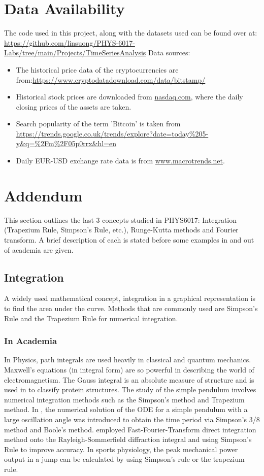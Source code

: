 \documentclass[a4paper, 10pt, conference]{ieeeconf}      %
\begin{document}
\section{Data Availability}{\label{data_aval}}
The code used in this project, along with the datasets used can be found over at: \url{https://github.com/linsuong/PHYS-6017-Labs/tree/main/Projects/TimeSeriesAnalysis}
\newline
Data sources:
\begin{itemize}
    \item The historical price data of the cryptocurrencies are from:\url{https://www.cryptodatadownload.com/data/bitstamp/}
    \item Historical stock prices are downloaded from \url{nasdaq.com}, where the daily closing prices of the assets are taken.
    \item Search popularity of the term 'Bitcoin' is taken from \url{https://trends.google.co.uk/trends/explore?date=today\%205-y&q=\%2Fm\%2F05p0rrx&hl=en}
    \item Daily EUR-USD exchange rate data is from \url{www.macrotrends.net}.
\end{itemize}

\newpage
\section{Addendum}{\label{addendum}}
This section outlines the last 3 concepts studied in PHYS6017: Integration (Trapezium Rule, Simpson's Rule, etc.), Runge-Kutta methods and Fourier transform. A brief description of each is stated before some examples in and out of academia are given.

\subsection{Integration}
A widely used mathematical concept, integration in a graphical representation is to find the area under the curve. Methods that are commonly used are Simpson's Rule and the Trapezium Rule for numerical integration.

\subsubsection{In Academia}
In Physics, path integrals are used heavily in classical and quantum mechanics. Maxwell's equations (in integral form) are so powerful in describing the world of electromagnetism. The Gauss integral is an absolute measure of structure and is used in \cite{Rogen2003} to classify protein structures. The study of the simple pendulum involves numerical integration methods such as the Simpson's method and Trapezium method. In \cite{abdulkareem2020numerical}, the numerical solution of the ODE for a simple pendulum with a large oscillation angle was introduced to obtain the time period via Simpson's 3/8 method and Boole's method. \cite{shen2006fast} employed Fast-Fourier-Transform direct integration method onto the Rayleigh-Sommerfield diffraction integral and using Simpson's Rule to improve accuracy. In sports physiology, the peak mechanical power output in a jump can be calculated by using Simpson's rule or the trapezium rule.
 
\end{document}
